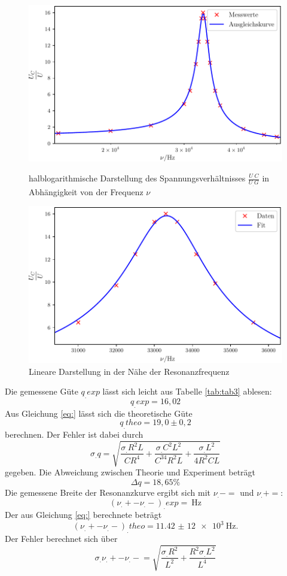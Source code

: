 \begin{figure}
\centering
\includegraphics[scale=0.8]{content/images/Graphc1.pdf}
\caption{halblogarithmische Darstellung des Spannungsverhältnisses $\frac{U_.C}{U_.G}$ in Abhängigkeit von der Frequenz $\nu$}\label{fig:abb2}
\includegraphics[scale=0.8]{content/images/Graphc2.pdf}
\caption{Lineare Darstellung in der Nähe der Resonanzfrequenz}
\label{fig:abb3}
\end{figure}
\newpage
\noindent
Die gemessene Güte $q_.{exp}$ lässt sich leicht aus Tabelle \ref{tab:tab3} ablesen:
\[
q_.{exp}=16,02
\]
Aus Gleichung \eqref{eq:} lässt sich die theoretische Güte 
\[
q_.{theo}=19,0\pm 0,2
\] berechnen.
Der Fehler ist dabei durch 
\[
\sigma_.q=\sqrt{\frac{\sigma_.R^2L}{CR^4}+\frac{\sigma_.C^2L^2}{C^34R^2L}+\frac{\sigma_.L^2}{4R^2CL}}
\]
gegeben.
Die Abweichung zwischen Theorie und Experiment beträgt
\[
\Delta q = 18,65\%
\]
Die gemessene Breite der Resonanzkurve ergibt sich mit $\nu_.-=$ und $\nu_.+=$:
\[
(\nu_.+-\nu_.-)_.{exp}=\SI{}{\hertz}
\]
Der aus Gleichung \eqref{eq:} berechnete beträgt
\[
(\nu_.+-\nu_.-)_.{theo}=\SI{11,42(12)e3}{\hertz}\text{.}
\]
Der Fehler berechnet sich über
\[
\sigma_.{\nu_.+-\nu_.-}=\sqrt{\frac{\sigma_.R^2}{L^2}+\frac{R^2\sigma_.L^2}{L^4}}
\]
